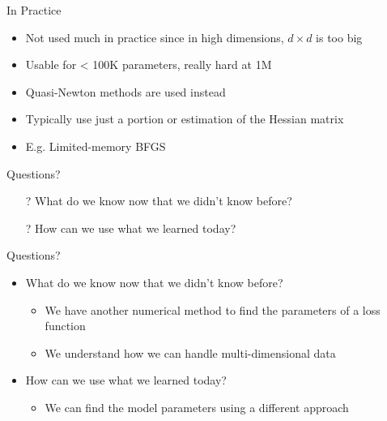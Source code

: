 \documentclass[aspectratio=169]{beamer}
\begin{document}
\begin{frame}{In Practice}

\begin{itemize}
\item Not used much in practice since in high dimensions, $d \times d$ is too big
\item Usable for < 100K parameters, really hard at 1M
\item Quasi-Newton methods are used instead
\item Typically use just a portion or estimation of the Hessian matrix
\item E.g. Limited-memory BFGS
\end{itemize}
\end{frame}
\begin{frame}{Questions?}
\begin{itemize}
	\item[?] What do we know now that we didn't know before?
	\vspace{2em}
	\item[?] How can we use what we learned today?
\end{itemize}
\end{frame}

\begin{frame}{Questions?}
\begin{itemize}
	\item What do we know now that we didn't know before?
	\begin{itemize}
	\item We have another numerical method to find the parameters of a loss function
	\item We understand how we can handle multi-dimensional data
	\end{itemize}

	\item How can we use what we learned today?
	\begin{itemize}
	\item We can  find the model parameters using a different approach
	\end{itemize}
\end{itemize}
\end{frame}
\end{document}
